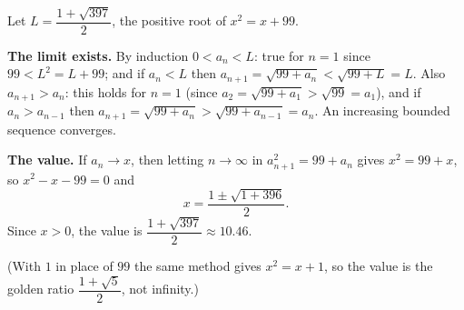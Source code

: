 Let $L=\dfrac{1+\sqrt{397}}{2}$, the positive root of $x^2=x+99$.

\textbf{The limit exists.} By induction $0<a_n<L$: true for $n=1$ since $99<L^2=L+99$; and if $a_n<L$ then $a_{n+1}=\sqrt{99+a_n}<\sqrt{99+L}=L$. Also $a_{n+1}>a_n$: this holds for $n=1$ (since $a_2=\sqrt{99+a_1}>\sqrt{99}=a_1$), and if $a_n>a_{n-1}$ then $a_{n+1}=\sqrt{99+a_n}>\sqrt{99+a_{n-1}}=a_n$. An increasing bounded sequence converges.

\textbf{The value.} If $a_n\to x$, then letting $n\to\infty$ in $a_{n+1}^2=99+a_n$ gives $x^2=99+x$, so $x^2-x-99=0$ and
\[
x=\dfrac{1\pm\sqrt{1+396}}{2}.
\]
Since $x>0$, the value is $\boxed{\dfrac{1+\sqrt{397}}{2}}\approx10.46$.

(With $1$ in place of $99$ the same method gives $x^2=x+1$, so the value is the golden ratio $\dfrac{1+\sqrt5}{2}$, not infinity.)
